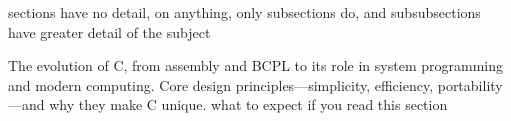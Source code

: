 \begin{NxSBox}[][Introduction to C]
	\begin{NxIDBox}
		sections have no detail, on anything, only subsections do, and subsubsections have greater detail of the subject
	\end{NxIDBox}
	\begin{NxIDBoxL}
		 The evolution of C, from assembly and BCPL to its role in system programming and modern computing.
		 Core design principles—simplicity, efficiency, portability—and why they make C unique.
		what to expect if you read this section
	\end{NxIDBoxL}
\end{NxSBox}




